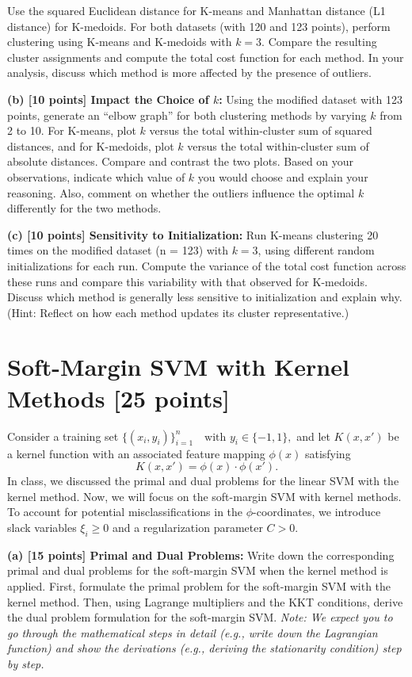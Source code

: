 \documentclass[11pt]{article}
\begin{document}
 Use the squared Euclidean distance for K-means and Manhattan distance (L1 distance) for K-medoids. For both datasets (with 120 and 123 points), perform clustering using K-means and K-medoids with $ k = 3 $. Compare the resulting cluster assignments and compute the total cost function for each method. In your analysis, discuss which method is more affected by the presence of outliers.

\vspace{0.1in}
\noindent\textbf{(b) [10 points] Impact the Choice of $ k $:} 
Using the modified dataset with 123 points, generate an ``elbow graph'' for both clustering methods by varying $ k $ from 2 to 10. For K-means, plot $ k $ versus the total within-cluster sum of squared distances, and for K-medoids, plot $ k $ versus the total within-cluster sum of absolute distances. Compare and contrast the two plots. Based on your observations, indicate which value of $ k $ you would choose and explain your reasoning. Also, comment on whether the outliers influence the optimal $ k $ differently for the two methods.

\vspace{0.1in}
\noindent\textbf{(c) [10 points] Sensitivity to Initialization:} 
Run K-means clustering 20 times on the modified dataset (n = 123) with $ k = 3 $, using different random initializations for each run. Compute the variance of the total cost function across these runs and compare this variability with that observed for K-medoids. Discuss which method is generally less sensitive to initialization and explain why. (Hint: Reflect on how each method updates its cluster representative.)

\section{Soft-Margin SVM with Kernel Methods [25 points]}  

Consider a training set $
\{(x_i,y_i)\}_{i=1}^{n} \quad \text{with } y_i \in \{-1,1\},
$ and let $K(x,x')$ be a kernel function with an associated feature mapping $\phi(x)$ satisfying
$$
K(x,x') = \phi(x) \cdot \phi(x').
$$
In class, we discussed the primal and dual problems for the linear SVM with the kernel method. Now, we will focus on the soft-margin SVM with kernel methods. To account for potential misclassifications in the $\phi$-coordinates,  we introduce slack variables $\xi_i \ge 0$ and a regularization parameter $C > 0$.

\vspace{0.1in}
\noindent\textbf{(a) [15 points] Primal and Dual Problems:} 
Write down the corresponding primal and dual problems for the soft-margin SVM when the kernel method is applied. First, formulate the primal problem for the soft-margin SVM with the kernel method. Then, using Lagrange multipliers and the KKT conditions, derive the dual problem formulation for the soft-margin SVM. \textit{Note: We expect you to go through the mathematical steps in detail (e.g., write down the Lagrangian function) and show the derivations (e.g., deriving the stationarity condition) step by step.}
\end{document}
